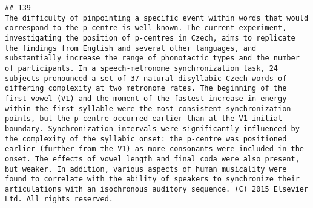 \documentclass[
  english,
  man]{apa6}
\begin{document}
\begin{verbatim}
## 139                                                                                                                                                                                                                                                                                                                                                                                                                                                                                                                                                                                                                                                                                                                                                                                                                                                                                                                                                                                                                                                                                                                                                                                                                                                                                                                                                                                         The difficulty of pinpointing a specific event within words that would correspond to the p-centre is well known. The current experiment, investigating the position of p-centres in Czech, aims to replicate the findings from English and several other languages, and substantially increase the range of phonotactic types and the number of participants. In a speech-metronome synchronization task, 24 subjects pronounced a set of 37 natural disyllabic Czech words of differing complexity at two metronome rates. The beginning of the first vowel (V1) and the moment of the fastest increase in energy within the first syllable were the most consistent synchronization points, but the p-centre occurred earlier than at the V1 initial boundary. Synchronization intervals were significantly influenced by the complexity of the syllabic onset: the p-centre was positioned earlier (further from the V1) as more consonants were included in the onset. The effects of vowel length and final coda were also present, but weaker. In addition, various aspects of human musicality were found to correlate with the ability of speakers to synchronize their articulations with an isochronous auditory sequence. (C) 2015 Elsevier Ltd. All rights reserved.

\end{verbatim}
\end{document}
